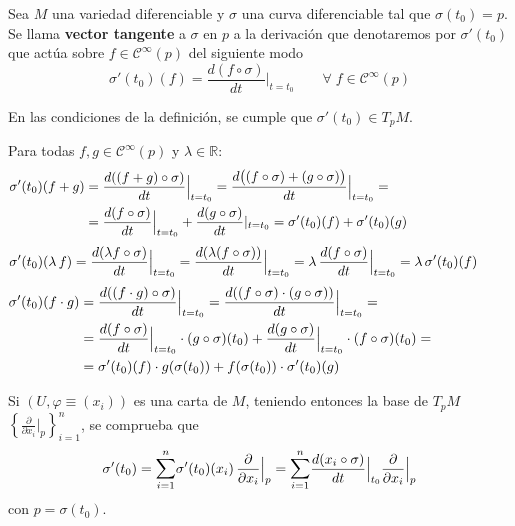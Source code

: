 \begin{defi}
Sea $M$ una variedad diferenciable y $\sigma$ una curva diferenciable tal que $\sigma(t_0)=p$. Se llama \textbf{vector tangente} a $\sigma$ en $p$ a la derivación que denotaremos por $\sigma'(t_0)$ que act\'ua sobre $f\in \mathcal{C}^{\infty}(p)$ del siguiente modo 
$$\sigma'(t_0)(f) = \frac{d (f\circ \sigma)}{dt}{\Big|_{t=t_0}} \qquad \forall\; f\in \mathcal{C}^{\infty}(p)$$
\end{defi}

\begin{prop}
En las condiciones de la definición, se cumple que $\sigma'(t_0) \in T_pM$.
\end{prop}
\begin{dem} Para todas $f, g \in \mathcal{C}^{\infty}(p)$ y $\lambda \in \mathbb{R}$:
     \[ \begin{split} \sigma'(t_0)(f+g) & = \dfrac{d ((f+g)\circ \sigma)}{dt}\Big|_{t=t_0} = \dfrac{d \big((f\circ \sigma)+(g\circ \sigma)\big)}{dt}{\Big|_{t=t_0}}  = \\ & = \dfrac{d (f\circ \sigma)}{dt}{\Big|_{t=t_0}} + \dfrac{d (g\circ \sigma)}{dt}{|_{t=t_0}} = \sigma'(t_0)(f) +\sigma'(t_0)(g)\end{split} \hspace{27mm} \]
     \[ \begin{split}\sigma'(t_0)(\lambda\,f) & = \dfrac{d (\lambda f\circ \sigma)}{dt}{\Big|_{t=t_0}} = \dfrac{d (\lambda(f\circ \sigma))}{dt}{\Big|_{t=t_0}} = \lambda\,\dfrac{d (f\circ \sigma)}{dt}{\Big|_{t=t_0}} = \lambda\,\sigma'(t_0)(f)\end{split}\hspace{5mm}\]
     \[ \begin{split}\sigma'(t_0)(f\cdot g) & = \dfrac{d ((f\cdot g)\circ \sigma)}{dt}{\Big|_{t=t_0}} = \dfrac{d ((f\circ \sigma) \cdot (g \circ \sigma))}{dt}{\Big|_{t=t_0}} = \\ & = \dfrac{d (f\circ \sigma)}{dt}{\Big|_{t=t_0}} \cdot (g\circ \sigma)(t_0) + \dfrac{d (g\circ \sigma)}{dt}{\Big|_{t=t_0}}\cdot (f\circ \sigma)(t_0) = \\ & = \sigma'(t_0)(f) \cdot g(\sigma(t_0)) + f(\sigma(t_0)) \cdot \sigma'(t_0)(g)\end{split} \hspace{20mm}\]
\end{dem}

Si $(U,\varphi\equiv (x_i))$ es una carta de $M$, teniendo entonces la base de $T_pM$ $\left\{{\frac{\partial}{\partial x_i}}{\big|_p}\right\}_{i=1}^n$, se comprueba que 
$$\sigma'(t_0) = \mathlarger{\sum}_{i=1}^n \sigma'(t_0)(x_i)\,{\frac{\partial}{\partial x_i}}{\Big|_p} = \mathlarger{\sum}_{i=1}^n {\frac{d(x_i \circ \sigma)}{dt}} {\Big|_{t_0}}{\frac{\partial}{\partial x_i}}{\Big|_p}$$con $p = \sigma(t_0)$.

